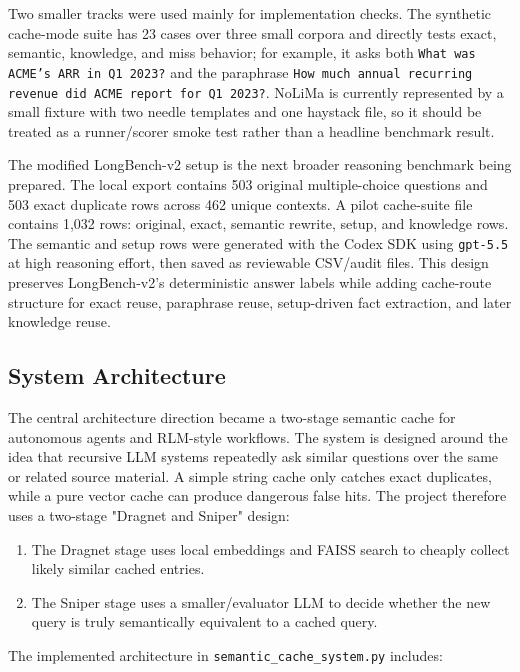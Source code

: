 \documentclass[10pt,a4paper]{article}
\begin{document}
Two smaller tracks were used mainly for implementation checks. The synthetic cache-mode suite has 23 cases over three small corpora and directly tests exact, semantic, knowledge, and miss behavior; for example, it asks both \texttt{What was ACME's ARR in Q1 2023?} and the paraphrase \texttt{How much annual recurring revenue did ACME report for Q1 2023?}. NoLiMa is currently represented by a small fixture with two needle templates and one haystack file, so it should be treated as a runner/scorer smoke test rather than a headline benchmark result.

The modified LongBench-v2 setup is the next broader reasoning benchmark being prepared. The local export contains 503 original multiple-choice questions and 503 exact duplicate rows across 462 unique contexts. A pilot cache-suite file contains 1,032 rows: original, exact, semantic rewrite, setup, and knowledge rows. The semantic and setup rows were generated with the Codex SDK using \texttt{gpt-5.5} at high reasoning effort, then saved as reviewable CSV/audit files. This design preserves LongBench-v2's deterministic answer labels while adding cache-route structure for exact reuse, paraphrase reuse, setup-driven fact extraction, and later knowledge reuse.

\subsection{System Architecture}

The central architecture direction became a two-stage semantic cache for autonomous agents and RLM-style workflows. The system is designed around the idea that recursive LLM systems repeatedly ask similar questions over the same or related source material. A simple string cache only catches exact duplicates, while a pure vector cache can produce dangerous false hits. The project therefore uses a two-stage "Dragnet and Sniper" design:

\begin{enumerate}
\item The Dragnet stage uses local embeddings and FAISS search to cheaply collect likely similar cached entries.
\item The Sniper stage uses a smaller/evaluator LLM to decide whether the new query is truly semantically equivalent to a cached query.
\end{enumerate}

The implemented architecture in \texttt{semantic\_cache\_system.py} includes:
\end{document}
